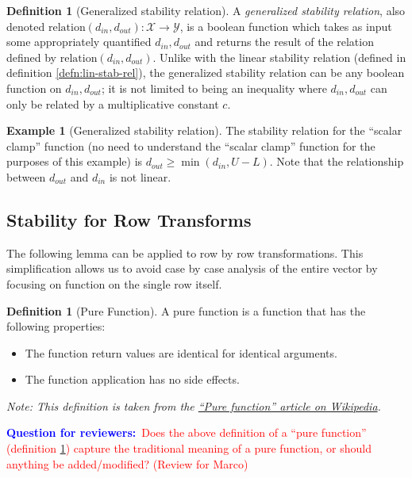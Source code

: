 \documentclass[11pt,a4paper]{article}
\theoremstyle{definition}
\newtheorem{definition}[theorem]{Definition}
\newtheorem{example}[theorem]{Example}
\newcommand{\din}{d_{in}}
\newcommand{\dout}{d_{out}}
\newcommand{\Relation}{\mathrm{relation}}
\newcommand{\questionr}[1]{\textcolor{blue}{\textbf{Question for reviewers:}}\textcolor{red}{~#1}}
\begin{document}
\begin{definition}[Generalized stability relation]
    A \textit{generalized stability relation}, also denoted $\Relation(\din, \dout):\mathcal{X}\rightarrow \mathcal{Y}$, is a boolean function which takes as input some appropriately quantified $\din, \dout$ and returns the result of the relation defined by $\Relation(\din, \dout)$. Unlike with the linear stability relation (defined in definition \ref{defn:lin-stab-rel}), the generalized stability relation can be any boolean function on $\din, \dout$; it is not limited to being an inequality where $\din,\dout$ can only be related by a multiplicative constant $c$.
\end{definition}

\begin{example}[Generalized stability relation]
    The stability relation for the ``scalar clamp'' function (no need to understand the ``scalar clamp'' function for the purposes of this example) is $\dout \geq \min(\din, U - L)$. Note that the relationship between $\dout$ and $\din$ is not linear.
\end{example}

\subsection{Stability for Row Transforms}
The following lemma can be applied to row by row transformations. This simplification allows us to avoid case by case analysis of the entire vector by focusing on function on the single row itself. 

\begin{definition}[Pure Function]
\label{defn:pure-fn}
    A pure function is a function that has the following properties:
    \begin{itemize}
        \item The function return values are identical for identical arguments.
        \item The function application has no side effects.
    \end{itemize}
\end{definition}

\emph{Note: This definition is taken from the \href{https://en.wikipedia.org/wiki/Pure_function}{``Pure function'' article on Wikipedia}.}

\questionr{Does the above definition of a ``pure function'' (definition \ref{defn:pure-fn}) capture the traditional meaning of a pure function, or should anything be added/modified? (Review for Marco)}
\end{document}
